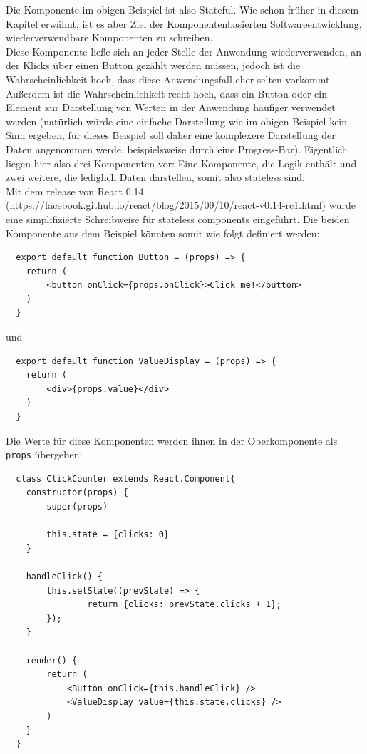 Die Komponente im obigen Beispiel ist also Stateful. Wie schon früher in diesem Kapitel erwähnt, ist es aber Ziel der Komponentenbasierten Softwareentwicklung, wiederverwendbare Komponenten zu schreiben.\\
Diese Komponente ließe sich an jeder Stelle der Anwendung wiederverwenden, an der Klicks über einen Button gezählt werden müssen, jedoch ist die Wahrscheinlichkeit hoch, dass diese Anwendungsfall eher selten vorkommt. Außerdem ist die Wahrscheinlichkeit recht hoch, dass ein Button oder ein Element zur Darstellung von Werten in der Anwendung häufiger verwendet werden (natürlich würde eine einfache Darstellung wie im obigen Beispiel kein Sinn ergeben, für dieses Beispiel soll daher eine komplexere Darstellung der Daten angenommen werde, beispielsweise durch eine Progress-Bar).
Eigentlich liegen hier also drei Komponenten vor: Eine Komponente, die Logik enthält und zwei weitere, die lediglich Daten darstellen, somit also stateless sind.\\

Mit dem release von React 0.14 (https://facebook.github.io/react/blog/2015/09/10/react-v0.14-rc1.html) wurde eine simplifizierte Schreibweise für stateless components eingeführt. Die beiden Komponente aus dem Beispiel könnten somit wie folgt definiert werden:

\begin{lstlisting}
  export default function Button = (props) => {
  	return (
  		<button onClick={props.onClick}>Click me!</button>
  	)
  }
\end{lstlisting}

und

\begin{lstlisting}
  export default function ValueDisplay = (props) => {
  	return (
  		<div>{props.value}</div>
  	)
  }
\end{lstlisting}

Die Werte für diese Komponenten werden ihnen in der Oberkomponente als \verb|props| übergeben:

\begin{lstlisting}
  class ClickCounter extends React.Component{
  	constructor(props) {
  		super(props)

  		this.state = {clicks: 0}
  	}

    handleClick() {
  		this.setState((prevState) => {
    			return {clicks: prevState.clicks + 1};
  		});
  	}

  	render() {
  		return (
  			<Button onClick={this.handleClick} />
  			<ValueDisplay value={this.state.clicks} />
  		)
  	}
  }
\end{lstlisting}

